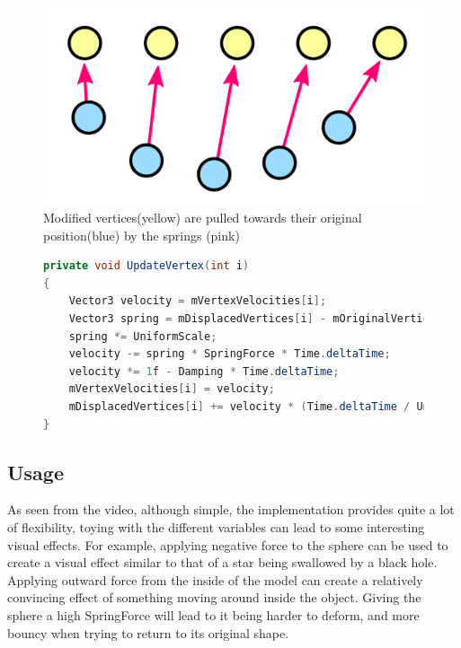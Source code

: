 \begin{figure}
    \includegraphics[width=\textwidth]{report/figures/catlike_mesh_deformation_springs.png}
    \caption{Modified vertices(yellow) are pulled towards their original position(blue) by the springs (pink)\cite{catlike_mesh_deformation}}
    \label{fig:catlike_mesh_deformation_springs}
\end{figure}

\begin{figure}
\begin{lstlisting}[label={code:catlike_mesh_deformation_update},language=csharp,caption={Catlike coding mesh deformation vertex update}]
private void UpdateVertex(int i)
{
    Vector3 velocity = mVertexVelocities[i];
    Vector3 spring = mDisplacedVertices[i] - mOriginalVertices[i];
    spring *= UniformScale; 
    velocity -= spring * SpringForce * Time.deltaTime;
    velocity *= 1f - Damping * Time.deltaTime;
    mVertexVelocities[i] = velocity;
    mDisplacedVertices[i] += velocity * (Time.deltaTime / UniformScale);
}
\end{lstlisting}
\end{figure}

\subsection{Usage}
As seen from the video, although simple, the implementation provides quite a lot of flexibility, toying with the different variables 
can lead to some interesting visual effects. 
For example, applying negative force to the sphere can be used to create a visual effect similar to that of a star being swallowed by a black hole.
Applying outward force from the inside of the model can create a relatively convincing effect of something moving around inside the object.
Giving the sphere a high SpringForce will lead to it being harder to deform, and more bouncy when trying to return to its original shape.

